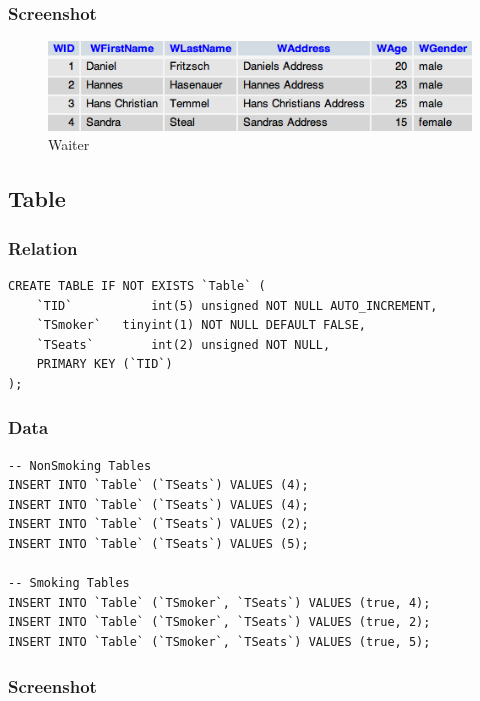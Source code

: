 \documentclass[10pt, a4paper]{article}
\begin{document}
\subsubsection{Screenshot}

\begin{figure}[htb]
	\centering
	\includegraphics[scale=0.9]{fig/waiter.png}
	\caption{Waiter}
\end{figure}

\subsection{Table}

\subsubsection{Relation}

\begin{verbatim}
CREATE TABLE IF NOT EXISTS `Table` (
  	`TID`      		int(5) unsigned NOT NULL AUTO_INCREMENT,
  	`TSmoker`  	tinyint(1) NOT NULL DEFAULT FALSE,
  	`TSeats`   		int(2) unsigned NOT NULL,
  	PRIMARY KEY (`TID`)
);
\end{verbatim}

\subsubsection{Data}

\begin{verbatim}
-- NonSmoking Tables
INSERT INTO `Table` (`TSeats`) VALUES (4);
INSERT INTO `Table` (`TSeats`) VALUES (4);
INSERT INTO `Table` (`TSeats`) VALUES (2);
INSERT INTO `Table` (`TSeats`) VALUES (5);

-- Smoking Tables
INSERT INTO `Table` (`TSmoker`, `TSeats`) VALUES (true, 4);
INSERT INTO `Table` (`TSmoker`, `TSeats`) VALUES (true, 2);
INSERT INTO `Table` (`TSmoker`, `TSeats`) VALUES (true, 5);
\end{verbatim}

\subsubsection{Screenshot}
\end{document}
